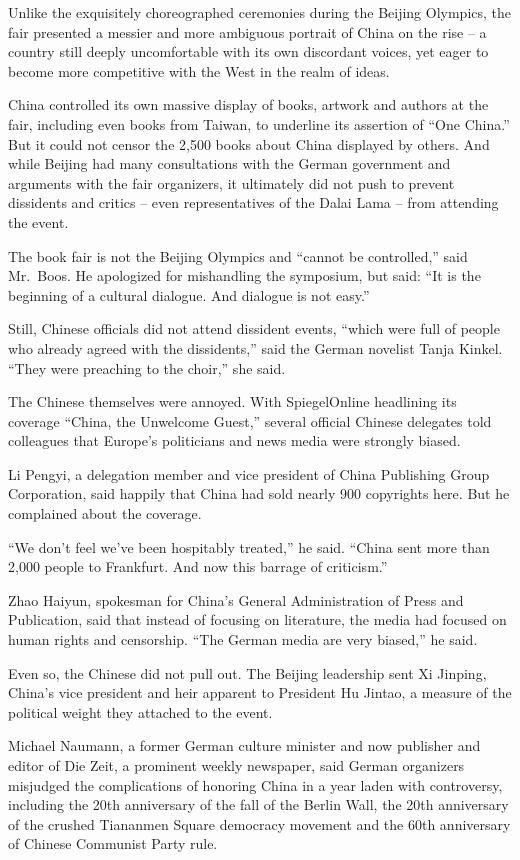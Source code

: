 ﻿\documentclass[12pt]{article}
\begin{document}
Unlike the exquisitely choreographed ceremonies during the Beijing Olympics, the fair presented a
messier and more ambiguous portrait of China on the rise -- a country still deeply uncomfortable
with its own discordant voices, yet eager to become more competitive with the West in the realm of
ideas.

China controlled its own massive display of books, artwork and authors at the fair, including even
books from Taiwan, to underline its assertion of ``One China.'' But it could not censor the 2,500
books about China displayed by others. And while Beijing had many consultations with the German
government and arguments with the fair organizers, it ultimately did not push to prevent dissidents
and critics -- even representatives of the Dalai Lama -- from attending the event.

The book fair is not the Beijing Olympics and ``cannot be controlled,'' said Mr.~Boos. He apologized
for mishandling the symposium, but said: ``It is the beginning of a cultural dialogue. And dialogue
is not easy.''

Still, Chinese officials did not attend dissident events, ``which were full of people who already
agreed with the dissidents,'' said the German novelist Tanja Kinkel. ``They were preaching to the
choir,'' she said.

The Chinese themselves were annoyed. With SpiegelOnline headlining its coverage ``China, the
Unwelcome Guest,'' several official Chinese delegates told colleagues that Europe's politicians and
news media were strongly biased.

Li Pengyi, a delegation member and vice president of China Publishing Group Corporation, said
happily that China had sold nearly 900 copyrights here. But he complained about the coverage.

``We don't feel we've been hospitably treated,'' he said. ``China sent more than 2,000 people to
Frankfurt. And now this barrage of criticism.''

Zhao Haiyun, spokesman for China's General Administration of Press and Publication, said that
instead of focusing on literature, the media had focused on human rights and censorship. ``The
German media are very biased,'' he said.

Even so, the Chinese did not pull out. The Beijing leadership sent Xi Jinping, China's vice
president and heir apparent to President Hu Jintao, a measure of the political weight they attached
to the event.

Michael Naumann, a former German culture minister and now publisher and editor of Die Zeit, a
prominent weekly newspaper, said German organizers misjudged the complications of honoring China in
a year laden with controversy, including the 20th anniversary of the fall of the Berlin Wall, the
20th anniversary of the crushed Tiananmen Square democracy movement and the 60th anniversary of
Chinese Communist Party rule.
\end{document}
